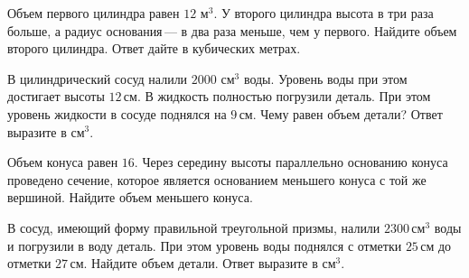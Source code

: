 \begin{consultation}
\begin{listofex}
		\item Объем первого цилиндра равен \(12\) м\(^3\). У второго цилиндра высота в три раза больше, а радиус основания --- в два раза меньше, чем у первого. Найдите объем второго цилиндра. Ответ дайте в кубических метрах.
		\item В цилиндрический сосуд налили \(2000\) см\(^3\) воды. Уровень воды при этом достигает высоты \(12\) см. В жидкость полностью погрузили деталь. При этом уровень жидкости в сосуде поднялся на \(9\) см. Чему равен объем детали? Ответ выразите в см\(^3\).
		\item Объем конуса равен \(16\). Через середину высоты параллельно основанию конуса проведено сечение, которое является основанием меньшего конуса с той же вершиной. Найдите объем меньшего конуса.
		\item В сосуд, имеющий форму правильной треугольной призмы, налили \(2300\) см\(^3\) воды и погрузили в воду деталь. При этом уровень воды поднялся с отметки \(25\) см до отметки \(27\) см. Найдите объем детали. Ответ выразите в см\(^3\).
	\end{listofex}
\end{consultation}

